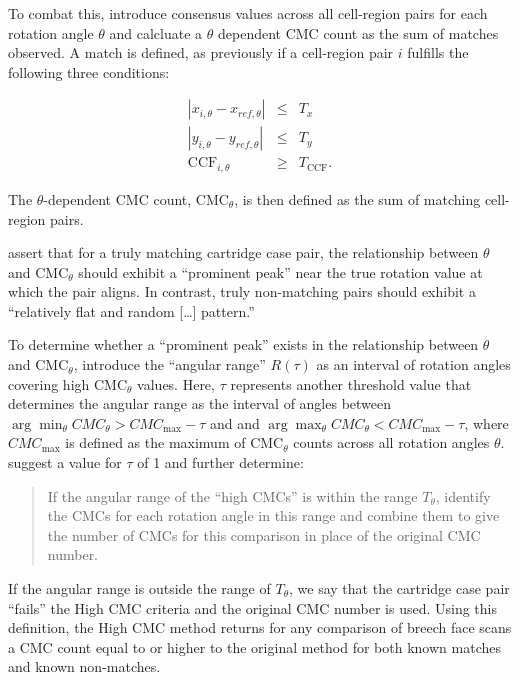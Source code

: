 To combat this, \citet{tong_improved_2015} introduce consensus values
across all cell-region pairs for each rotation angle \(\theta\) and
calcluate a \(\theta\) dependent CMC count as the sum of matches
observed. A match is defined, as previously if a cell-region pair \(i\)
fulfills the following three conditions:

\begin{eqnarray}\label{eqn:high-cmc}
|x_{i,\theta} - x_{ref,\theta}| &\leq& T_x \\ \nonumber
|y_{i,\theta} - y_{ref,\theta}| &\leq& T_y \\ \nonumber
\text{CCF}_{i,\theta} &\geq& T_{\text{CCF}}.
\end{eqnarray}

The \(\theta\)-dependent CMC count, CMC\(_\theta\), is then defined as
the sum of matching cell-region pairs.

\citet{tong_improved_2015} assert that for a truly matching cartridge
case pair, the relationship between \(\theta\) and CMC\(_\theta\) should
exhibit a ``prominent peak'' near the true rotation value at which the
pair aligns. In contrast, truly non-matching pairs should exhibit a
``relatively flat and random {[}\ldots{]} pattern.''

To determine whether a ``prominent peak'' exists in the relationship
between \(\theta\) and CMC\(_\theta\), \citet{tong_improved_2015}
introduce the ``angular range'' \(R (\tau)\) as an interval of rotation
angles covering high CMC\(_\theta\) values. Here, \(\tau\) represents
another threshold value that determines the angular range as the
interval of angles between
\(\arg \min_\theta CMC_\theta > CMC_{\text{max}} - \tau\) and and
\(\arg \max_\theta CMC_\theta < CMC_{\text{max}} - \tau\), where
\(CMC_{\text{max}}\) is defined as the maximum of CMC\(_\theta\) counts
across all rotation angles \(\theta\). \citet{tong_improved_2015}
suggest a value for \(\tau\) of 1 and further determine:

\begin{quote}
If the angular range of the ``high CMCs'' is within the range
\(T_\theta\), identify the CMCs for each rotation angle in this range
and combine them to give the number of CMCs for this comparison in place
of the original CMC number.
\end{quote}

If the angular range is outside the range of \(T_\theta\), we say that
the cartridge case pair ``fails'' the High CMC criteria and the original
CMC number is used. Using this definition, the High CMC method returns
for any comparison of breech face scans a CMC count equal to or higher
to the original method for both known matches and known non-matches.

